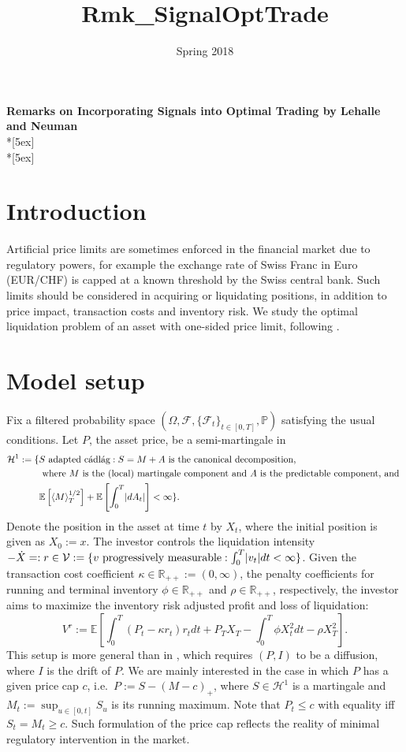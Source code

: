 \documentclass[openany,oneside]{article}
\title{Rmk_SignalOptTrade}
\date{Spring 2018}
\theoremstyle{definition}
\theoremstyle{remark}
\newcommand{\E}{\mathbb{E}} %
\renewcommand{\P}{\mathbb{P}} %
\newcommand{\F}{\mathcal{F}} %
\DeclarePairedDelimiter{\abs}{\lvert}{\rvert} %
\newcommand{\ts}{\textstyle}
\begin{document}
\begin{center}	
	\textbf{\Large Remarks on Incorporating Signals into Optimal Trading by Lehalle and Neuman} \\*[5ex]
    \thedate \\*[5ex]
\end{center}


\section{Introduction}
Artificial price limits are sometimes enforced in the financial market due to regulatory powers, for example the exchange rate of Swiss Franc in Euro (EUR/CHF) is capped at a known threshold by the Swiss central bank. Such limits should be considered in acquiring or liquidating positions, in addition to price impact, transaction costs and inventory risk. We study the optimal liquidation problem of an asset with one-sided price limit, following \cite{lehalle2017incorporating}.


\section{Model setup}
Fix a filtered probability space $(\Omega, \F, \{\F_t\}_{t\in[0,T]}, \P)$ satisfying the usual conditions. Let $P$, the asset price, be a semi-martingale in
\begin{align*}
\mathcal{H}^1:=\{ & S \textrm{ adapted c\'adl\'ag} : S=M+A \textrm{ is the canonical decomposition, } \\
& \textrm{ where $M$ is the (local) martingale component and $A$ is the predictable component, and } \\
& \E\left[\langle M\rangle^{1/2}_T\right] + \E\left[\int_0^T \abs{d A_t}\right] < \infty\}.
\end{align*}
Denote the position in the asset at time $t$ by $X_t$, where the initial position is given as $X_0:=x$. The investor controls the liquidation intensity $-\dot{X} =: r \in \mathcal{V} := \{v \textrm{ progressively measurable} : \int_0^T \abs{v_t} dt < \infty \}$. Given the transaction cost coefficient $\kappa\in\mathbb{R}_{++}:=(0,\infty)$, the penalty coefficients for running and terminal inventory $\phi\in\mathbb{R}_{++}$ and $\rho\in\mathbb{R}_{++}$, respectively, the investor aims to maximize the inventory risk adjusted profit and loss of liquidation:
\[
\ts V^r:= \E\left[\int_0^T (P_t - \kappa r_t)r_t dt + P_T X_T - \int_0^T \phi X_t^2 dt - \rho X_T^2 \right].
\]
This setup is more general than in \cite{lehalle2017incorporating}, which requires $(P,I)$ to be a diffusion, where $I$ is the drift of $P$. We are mainly interested in the case in which $P$ has a given price cap $c$, i.e.\ $P:=S-(M-c)_+$, where $S\in\mathcal{H}^1$ is a martingale and $M_t:=\sup_{u\in[0,t]} S_u$ is its running maximum. Note that $P_t\le c$ with equality iff $S_t=M_t\ge c$. Such formulation of the price cap reflects the reality of minimal regulatory intervention in the market.
\end{document}
